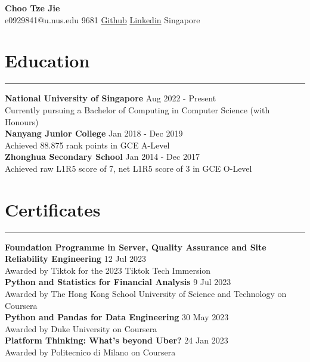 \documentclass[letterpaper,11pt]{article}
\begin{document}
    {\fontsize{15}{20}\selectfont \textbf{Choo Tze Jie}}
    \\
    \faEnvelope\space e0929841@u.nus.edu 
    \faMobile{} 9681
    \faGithub\space \href{https://github.com/tjch-o}{Github} 
    \faLinkedin\space \href{https://www.linkedin.com/in/tze-jie-choo/}{Linkedin}
    \faMapMarker\space Singapore
     
    \section{Education}
    \vspace{-0.5em} 
    \hrule
    \vspace{0.5em}
    \textbf{National University of Singapore} \hfill Aug 2022 - Present
    \\
    Currently pursuing a Bachelor of Computing in Computer Science (with Honours)
    \\
    \vspace{0.5em}
    \textbf{Nanyang Junior College}  \hfill Jan 2018 - Dec 2019
    \\
    Achieved 88.875 rank points in GCE A-Level 
    \\
    \vspace{0.5em}
    \textbf{Zhonghua Secondary School} \hfill Jan 2014 - Dec 2017
    \\
    Achieved raw L1R5 score of 7, net L1R5 score of 3 in GCE O-Level
     
    \section{Certificates}
    \vspace{-0.5em}
    \hrule
    \vspace{0.5em}
    \textbf{Foundation Programme in Server, Quality Assurance and Site Reliability Engineering} 
    \hfill 12 Jul 2023
    \\
    Awarded by Tiktok for the 2023 Tiktok Tech Immersion
    \\
    \vspace{0.5em}
    \textbf{Python and Statistics for Financial Analysis} \hfill 9 Jul 2023
    \\
    Awarded by The Hong Kong School University of Science and Technology on Coursera
    \\
    \vspace{0.5em}
    \textbf{Python and Pandas for Data Engineering} \hfill 30 May 2023
    \\
    Awarded by Duke University on Coursera
    \\
    \vspace{0.5em}
    \textbf{Platform Thinking: What's beyond Uber?} \hfill 24 Jan 2023
    \\
    Awarded by Politecnico di Milano on Coursera
     
\end{document}
